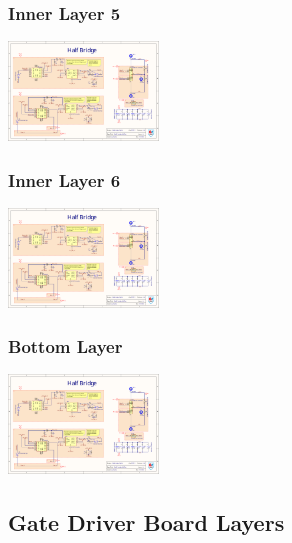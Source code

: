 \subsubsection{Inner Layer 5}
\begin{center}
	\includegraphics[page=7,width=0.3\textwidth,angle=90,origin=c]{./Appendix/Job3.pdf}
\end{center}
\subsubsection{Inner Layer 6}
\begin{center}
	\includegraphics[page=8,width=0.3\textwidth,angle=90,origin=c]{./Appendix/Job3.pdf}
\end{center}
\subsubsection{Bottom Layer}
\begin{center}
	\includegraphics[page=9,width=0.3\textwidth,angle=90,origin=c]{./Appendix/Job3.pdf}
\end{center}


\def\excerpt{\subsection{Gate Driver Board Schematic}\label{section:gate_driver_files}}


\subsection{Gate Driver Board Layers}

